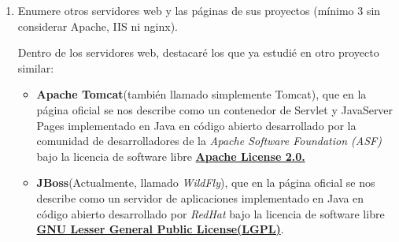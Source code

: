 \documentclass[paper=a4, fontsize=11pt]{scrartcl} %
\numberwithin{equation}{section} %
\numberwithin{figure}{section} %
\numberwithin{table}{section} %
\begin{document}
\begin{enumerate}
		Para el caso de Ubuntu, instalaremos el servicio como un pack usando el comando \textit{sudo
		apt-get install lamp-server\^}.
		
		Para CentOS, lo instalaremos componente a componente para mostrar ambos métodos, es decir:
		\begin{itemize}
			\item \textit{httpd} para instalar el servicio Apache, lo añadiremos a la lista de
			ejecuciones durante el arranque con \textit{systemctl enable httpd.service}.
			
			\item \textit{mariadb} para la base de datos de Maria-DB\footnote{Originalmente, la base
			de datos a la que hace referencia es \textit{MySQL} pero hace algún tiempo, tomó fuerza la
			base de datos alternativa de \textit{Maria-DB}}
			
			\item \textit{php} y \textit{php-mysql} para el servidor PHP.
		\end{itemize}
		
		Por último, en ambos sistemas operativos reiniciaremos los servicios para asegurarnos que los
		cambios de configuración que se produjeron durante la instalación de los mismo surte efecto
		\footnote{Sería conveniente incluir el servicio de Apache para que sea capaz de atravesar el
		cortafuegos al tratarse de un servicio web}.
		
		\item Enumere otros servidores web y las páginas de sus proyectos (mínimo 3 sin considerar
		Apache, IIS ni nginx).
		
		Dentro de los servidores web, destacaré los que ya estudié en otro proyecto similar\cite{TWG}:
		\begin{itemize}
			\item \textbf{Apache Tomcat}\cite{TC_official}(también llamado simplemente Tomcat), que
			en la página oficial se nos describe como un contenedor de Servlet y JavaServer Pages
			implementado en Java en código abierto desarrollado por la comunidad de desarrolladores
			de la \textit{Apache Software Foundation (ASF)} bajo la licencia de software libre
			\href{https://www.apache.org/licenses/LICENSE-2.0.html}{\textbf{Apache License 2.0.}}
			
			\item \textbf{JBoss}\cite{WF_official}(Actualmente, llamado \textit{WildFly}), que en la
			página oficial se nos describe como un servidor de aplicaciones implementado en Java en
			código abierto desarrollado por \textit{RedHat} bajo la licencia de software libre
			\href{https://www.gnu.org/licenses/lgpl.html}{\textbf{GNU Lesser General Public License(LGPL)}}.
			

\end{itemize}
\end{enumerate}
\end{document}
